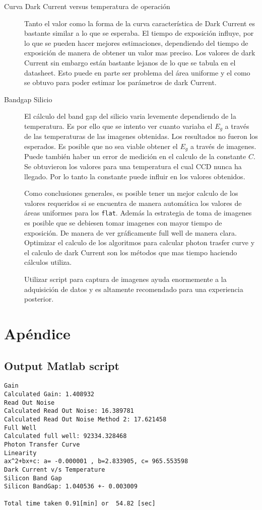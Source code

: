 \documentclass[a4paper,10pt]{article}
\begin{document}
\begin{description}
\item [Curva Dark Current versus temperatura de operación] Tanto el valor 
como la forma de la curva característica de Dark Current es bastante similar a
lo que se esperaba.  El tiempo de exposición influye, por lo que se pueden
hacer mejores estimaciones, dependiendo  del tiempo de exposición de manera de
obtener un valor mas preciso. Los valores de dark Current sin embargo están
bastante lejanos de lo que se tabula en el datasheet. Esto puede en parte ser
problema del área uniforme y el como se obtuvo para poder estimar los
parámetros de dark Current.

\item [Bandgap Silicio] El cálculo del band gap del silicio varia levemente
dependiendo de la temperatura. Es por ello que se intento ver cuanto variaba el
$E_g$ a través de las temperaturas de las imagenes obtenidas.  Los resultados
no fueron los esperados. Es posible que no sea viable obtener el $E_g$ a través
de imagenes. Puede también haber un error de medición en el calculo de la
constante $C$. Se obtuvieron los valores para una temperatura el cual CCD nunca
ha llegado. Por lo tanto la constante puede influir en los valores obtenidos.

Como conclusiones generales, es posible tener un mejor calculo de los valores
requeridos si se encuentra de manera automática los valores de áreas uniformes
para los {\tt flat}.  Además la estrategia de toma de imagenes es posible que
se debiesen tomar imagenes con mayor tiempo de exposición. De manera de ver
gráficamente full well de manera clara. Optimizar el calculo de los algoritmos
para calcular photon trasfer curve y el calculo de dark Current son los métodos
que mas tiempo haciendo cálculos utiliza.

Utilizar script para captura de imagenes ayuda enormemente a la adquisición de
datos y es altamente recomendado para una experiencia posterior.
\end{description}
\appendix
\section{Apéndice}
\label{appendix:matlab}
\subsection{Output Matlab script}
{\tiny
\begin{verbatim}
Gain
Calculated Gain: 1.408932 
Read Out Noise
Calculated Read Out Noise: 16.389781 
Calculated Read Out Noise Method 2: 17.621458 
Full Well
Calculated full well: 92334.328468 
Photon Transfer Curve
Linearity
ax^2+bx+c: a= -0.000001 , b=2.833905, c= 965.553598 
Dark Current v/s Temperature
Silicon Band Gap
Silicon BandGap: 1.040536 +- 0.003009

Total time taken 0.91[min] or  54.82 [sec]
\end{verbatim}
}
\end{document}
